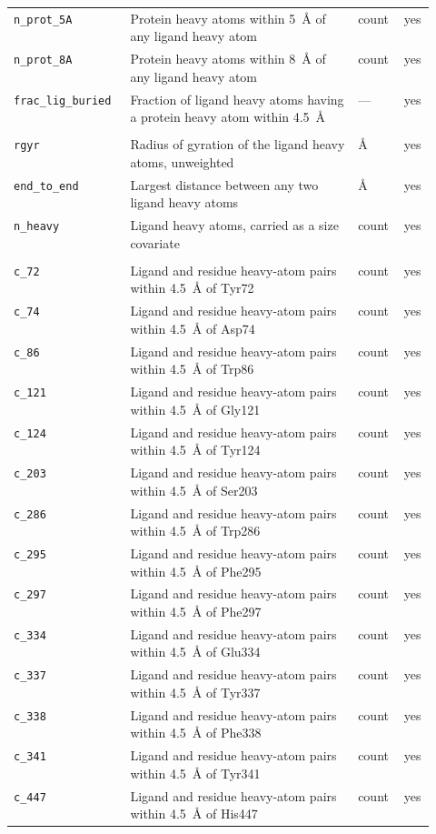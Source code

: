 \begin{tabular}{l>{\raggedright\arraybackslash}p{0.54\linewidth}ll}
\texttt{n\_prot\_5A} & Protein heavy atoms within \SI{5}{\angstrom} of any ligand heavy atom & count & yes \\
\texttt{n\_prot\_8A} & Protein heavy atoms within \SI{8}{\angstrom} of any ligand heavy atom & count & yes \\
\texttt{frac\_lig\_buried} & Fraction of ligand heavy atoms having a protein heavy atom within \SI{4.5}{\angstrom} & --- & yes \\
\addlinespace
\multicolumn{4}{l}{\itshape Shape of the bound conformation} \\
\addlinespace[2pt]
\texttt{rgyr} & Radius of gyration of the ligand heavy atoms, unweighted & \si{\angstrom} & yes \\
\texttt{end\_to\_end} & Largest distance between any two ligand heavy atoms & \si{\angstrom} & yes \\
\texttt{n\_heavy} & Ligand heavy atoms, carried as a size covariate & count & yes \\
\addlinespace
\multicolumn{4}{l}{\itshape Per-residue contacts} \\
\addlinespace[2pt]
\texttt{c\_72} & Ligand and residue heavy-atom pairs within \SI{4.5}{\angstrom} of Tyr72 & count & yes \\
\texttt{c\_74} & Ligand and residue heavy-atom pairs within \SI{4.5}{\angstrom} of Asp74 & count & yes \\
\texttt{c\_86} & Ligand and residue heavy-atom pairs within \SI{4.5}{\angstrom} of Trp86 & count & yes \\
\texttt{c\_121} & Ligand and residue heavy-atom pairs within \SI{4.5}{\angstrom} of Gly121 & count & yes \\
\texttt{c\_124} & Ligand and residue heavy-atom pairs within \SI{4.5}{\angstrom} of Tyr124 & count & yes \\
\texttt{c\_203} & Ligand and residue heavy-atom pairs within \SI{4.5}{\angstrom} of Ser203 & count & yes \\
\texttt{c\_286} & Ligand and residue heavy-atom pairs within \SI{4.5}{\angstrom} of Trp286 & count & yes \\
\texttt{c\_295} & Ligand and residue heavy-atom pairs within \SI{4.5}{\angstrom} of Phe295 & count & yes \\
\texttt{c\_297} & Ligand and residue heavy-atom pairs within \SI{4.5}{\angstrom} of Phe297 & count & yes \\
\texttt{c\_334} & Ligand and residue heavy-atom pairs within \SI{4.5}{\angstrom} of Glu334 & count & yes \\
\texttt{c\_337} & Ligand and residue heavy-atom pairs within \SI{4.5}{\angstrom} of Tyr337 & count & yes \\
\texttt{c\_338} & Ligand and residue heavy-atom pairs within \SI{4.5}{\angstrom} of Phe338 & count & yes \\
\texttt{c\_341} & Ligand and residue heavy-atom pairs within \SI{4.5}{\angstrom} of Tyr341 & count & yes \\
\texttt{c\_447} & Ligand and residue heavy-atom pairs within \SI{4.5}{\angstrom} of His447 & count & yes \\
\bottomrule
\end{tabular}

